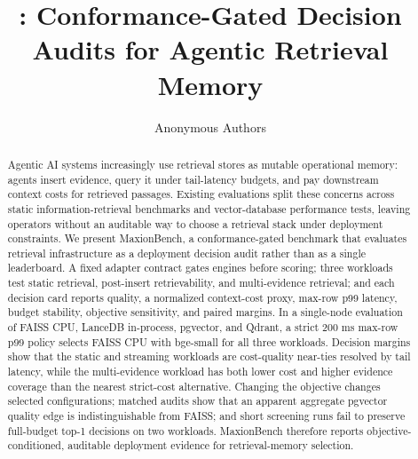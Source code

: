 \documentclass{article}
\title{\sys: Conformance-Gated Decision Audits for Agentic Retrieval Memory}
\author{Anonymous Authors}
\begin{document}
\maketitle

\begin{abstract}
Agentic AI systems increasingly use retrieval stores as mutable operational memory:
agents insert evidence, query it under tail-latency budgets, and pay downstream
context costs for retrieved passages. Existing evaluations split these concerns
across static information-retrieval benchmarks and vector-database performance
tests, leaving operators without an auditable way to choose a retrieval stack under
deployment constraints. We present MaxionBench, a conformance-gated benchmark
that evaluates retrieval infrastructure as a deployment decision audit rather than
as a single leaderboard. A fixed adapter contract gates engines before scoring;
three workloads test static retrieval, post-insert retrievability, and multi-evidence
retrieval; and each decision card reports quality, a normalized context-cost proxy,
max-row p99 latency, budget stability, objective sensitivity, and paired margins.
In a single-node evaluation of FAISS CPU, LanceDB in-process,
pgvector, and Qdrant, a strict 200 ms max-row p99 policy selects FAISS CPU with
bge-small for all three workloads. Decision margins show that the static and
streaming workloads are cost-quality near-ties resolved by tail latency, while the
multi-evidence workload has both lower cost and higher evidence coverage than the
nearest strict-cost alternative. Changing the objective changes selected
configurations; matched audits show that an apparent aggregate pgvector quality
edge is indistinguishable from FAISS; and short screening runs fail to preserve
full-budget top-1 decisions on two workloads. MaxionBench therefore reports
objective-conditioned, auditable deployment evidence for retrieval-memory
selection.
\end{abstract}




\FloatBarrier

\FloatBarrier



\FloatBarrier
\clearpage



\clearpage
\appendix



\end{document}
